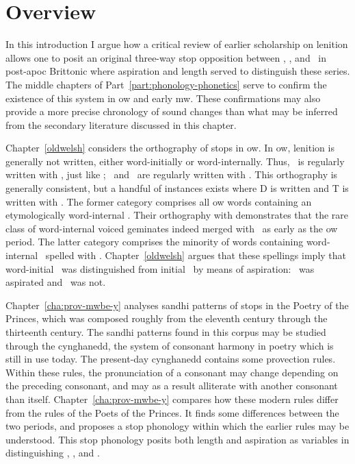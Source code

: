 \section{Overview}
\label{sec:overview-1}

In this introduction I argue how a critical review of earlier scholarship on lenition allows one to posit an original three-way stop opposition between \xT, \xD, and \lT\ in post-\gls{apoc} Brittonic where aspiration and length served to distinguish these series. The middle chapters of Part~\ref{part:phonology-phonetics} serve to confirm the existence of this system in \gls{ow} and early \gls{mw}. These confirmations may also provide a more precise chronology of sound changes than what may be inferred from the secondary literature discussed in this chapter.

Chapter~\ref{oldwelsh} considers the orthography of stops in \gls{ow}. In \gls{ow}, lenition is generally not written, either word-initially or word-internally. Thus, \lT\ is regularly written with , just like \xT; \lD\ and \xD\ are regularly written with . This orthography is generally consistent, but a handful of instances exists where \gls{D} is written  and \gls{T} is written with . The former category comprises all \gls{ow} words containing an etymologically word-internal \xD. Their orthography with  demonstrates that the rare class of word-internal voiced geminates indeed merged with \lT\ as early as the \gls{ow} period. The latter category comprises the minority of words containing word-internal \lT\ spelled with . Chapter~\ref{oldwelsh} argues that these spellings imply that word-initial \lT\ was distinguished from initial \xD\ by means of aspiration: \lT\ was aspirated and \xD\ was not.

Chapter~\ref{cha:prov-mwbe-y} analyses sandhi patterns of stops in the Poetry of the Princes, which was composed roughly from the eleventh century through the thirteenth century. The sandhi patterns found in this corpus  may be studied through the cynghanedd, the system of consonant harmony in poetry which is still in use today. The present-day cynghanedd  contains some provection rules. Within these rules, the pronunciation of a consonant may change depending on the preceding consonant, and may as a result alliterate with another consonant than itself. Chapter~\ref{cha:prov-mwbe-y} compares how these modern rules differ from the rules of the Poets of the Princes. It finds some differences between the two periods, and proposes a stop phonology within which the earlier rules may be understood. This stop phonology posits both length and aspiration as variables in distinguishing \xT, \lT, and \xD.

